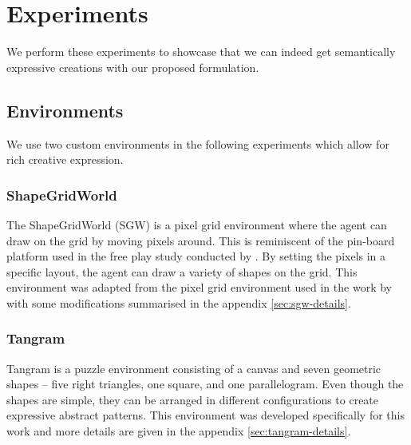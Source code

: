 \chapter{Experiments}
\label{sec:experiments}

We perform these experiments to showcase that we can indeed get semantically expressive creations with our proposed formulation.


\section{Environments}

We use two custom environments in the following experiments which allow for rich creative expression.

\subsection{ShapeGridWorld}
\label{sec:sgw}
The ShapeGridWorld (SGW) is a pixel grid environment where the agent can draw on the grid by moving pixels around.
This is reminiscent of the pin-board platform used in the free play study conducted by \citet{diggs}.
By setting the pixels in a specific layout, the agent can draw a variety of shapes on the grid.
This environment was adapted from the pixel grid environment used in the work by \citet{rair} with some modifications summarised in the appendix \ref{sec:sgw-details}.

\subsection{Tangram}
\label{sec:tangram}
Tangram is a puzzle environment consisting of a canvas and seven geometric shapes -- five right triangles, one square, and one parallelogram.
Even though the shapes are simple, they can be arranged in different configurations to create expressive abstract patterns.
This environment was developed specifically for this work and more details are given in the appendix \ref{sec:tangram-details}.


